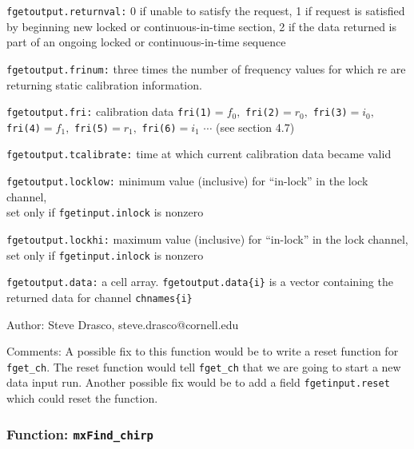 \begin{description}
\item{\tt fgetoutput.returnval:} 0 if unable to satisfy the request, 1 if
request is satisfied by beginning new locked or continuous-in-time section, 2
if the data returned is part of an ongoing locked or continuous-in-time sequence

\item{\tt fgetoutput.frinum:} three times the number of frequency values
for which re are returning static calibration information.

\item{\tt fgetoutput.fri:} calibration data \texttt{fri(1)}$=f_{0},$
\texttt{fri(2)}$=r_{0},$ \texttt{fri(3)}$=i_{0},$ \texttt{fri(4)}$=f_{1},$
\texttt{fri(5)}$=r_{1},$ \texttt{fri(6)}$=i_{1}$ $\cdots$ (see section 4.7)

\item{\tt fgetoutput.tcalibrate:} time at which current calibration data
became valid

\item{\tt fgetoutput.locklow:} minimum value (inclusive) for ``in-lock''
in the lock channel, \\
set only if \texttt{fgetinput.inlock} is nonzero

\item{\tt fgetoutput.lockhi:} maximum value (inclusive) for ``in-lock''
in the lock channel, \\
set only if \texttt{fgetinput.inlock} is nonzero

\item{\tt fgetoutput.data:} a cell array. \texttt{fgetoutput.data\{i\}}
is a vector containing the returned data for channel \texttt{chnames\{i\}}
\end{description}

\begin{description}
\item{Author:} Steve Drasco, steve.drasco@cornell.edu
\item{Comments:}
A possible fix to this function would be to write a reset function for \texttt{fget\_ch}.
The reset function would tell \texttt{fget\_ch} that we are going to start a new data 
input run. Another possible fix would be to add a field \texttt{fgetinput.reset} which 
could reset the function.
\end{description}

\subsubsection{Function: {\tt mxFind\_chirp}}
\label{sss:mxFind_chirp}

